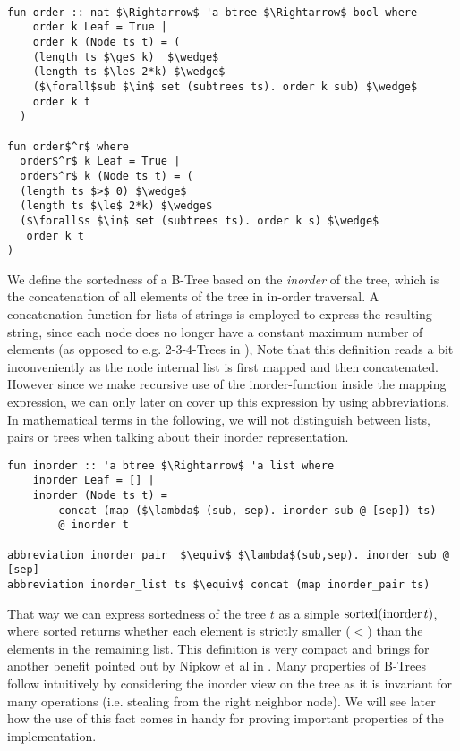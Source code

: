\begin{lstlisting}[mathescape=true, language=Isabelle]

fun order :: nat $\Rightarrow$ 'a btree $\Rightarrow$ bool where
    order k Leaf = True |
    order k (Node ts t) = (
    (length ts $\ge$ k)  $\wedge$
    (length ts $\le$ 2*k) $\wedge$
    ($\forall$sub $\in$ set (subtrees ts). order k sub) $\wedge$
    order k t
  )

fun order$^r$ where
  order$^r$ k Leaf = True |
  order$^r$ k (Node ts t) = (
  (length ts $>$ 0) $\wedge$
  (length ts $\le$ 2*k) $\wedge$
  ($\forall$s $\in$ set (subtrees ts). order k s) $\wedge$
   order k t
)

\end{lstlisting}

We define the sortedness of a B-Tree based on the \textit{inorder} of the tree,
which is the concatenation of all elements of the tree in in-order traversal.
A concatenation function for lists of strings
is employed to express the resulting string,
since each node does no longer have a constant maximum number of elements (as opposed to
e.g. 2-3-4-Trees in \parencite{DBLP:conf/itp/Nipkow16}),
Note that this definition reads a bit inconveniently
as the node internal list is first mapped and then concatenated.
However since we make recursive use of the inorder-function
inside the mapping expression, we can only later on cover up this expression
by using abbreviations.
In mathematical terms in the following, we will not distinguish between lists, 
pairs or trees when talking about their inorder representation.

\begin{lstlisting}[mathescape=true, language=Isabelle]
fun inorder :: 'a btree $\Rightarrow$ 'a list where
    inorder Leaf = [] |
    inorder (Node ts t) = 
        concat (map ($\lambda$ (sub, sep). inorder sub @ [sep]) ts)
        @ inorder t

abbreviation inorder_pair  $\equiv$ $\lambda$(sub,sep). inorder sub @ [sep]
abbreviation inorder_list ts $\equiv$ concat (map inorder_pair ts)
\end{lstlisting}

That way we can express sortedness of the tree $t$ as a simple $\operatorname{sorted} (\operatorname{inorder} t)$,
where sorted returns whether each element is strictly smaller ($<$) than the elements in the remaining list.
This definition is very compact and brings for another benefit pointed out by Nipkow et al in \parencite{DBLP:conf/itp/Nipkow16}.
Many properties of B-Trees follow intuitively by considering
the inorder view on the tree as it is invariant for many operations (i.e. stealing from the right neighbor node).
We will see later how the use of this fact comes in handy for proving
important properties of the implementation.

